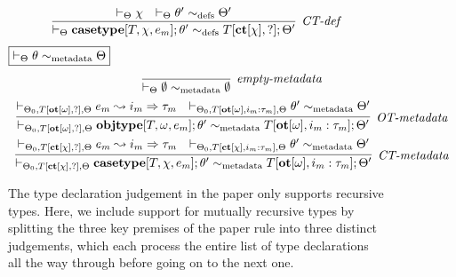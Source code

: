 \begin{figure}[h]
\[\begin{array}{c}
\infer[\textit{CT-def}]
  {\vdash_{\Theta} \keyw{casetype}[T,\chi,e_m];\theta' \sim_{\text{defs}} T[\keyw{ct}[\chi], ?]; \Theta'}
  { \vdash_\Theta \chi
  & \vdash _\Theta \theta' \sim_{\text{defs}} \Theta'}
\end{array}
\]
$\fbox{$\vdash_\Theta \theta \sim_{\text{metadata}} \Theta$}$
\[
\begin{array}{c}
\infer[\textit{empty-metadata}]
  {\vdash_{\Theta} \emptyset \sim_{\text{metadata}} \emptyset}
  { }\\[1ex]
\infer[\textit{OT-metadata}]
  {\vdash_{\Theta_0, T[\keyw{ot}[\omega],?], \Theta} \keyw{objtype}[T, \omega, e_m]; \theta' \sim_{\text{metadata}} T[\keyw{ot}[\omega],i_m:\tau_m]; \Theta'}
  { \vdash_{\Theta_0, T[\keyw{ot}[\omega], ?], \Theta} e_m \leadsto i_m \Rightarrow \tau_m
  & \vdash_{\Theta_0, T[\keyw{ot}[\omega], i_m : \tau_m], \Theta} \theta' \sim_{\text{metadata}} \Theta'}\\[1ex]

\infer[\textit{CT-metadata}]
  {\vdash_{\Theta_0, T[\keyw{ct}[\chi],?], \Theta} \keyw{casetype}[T, \chi, e_m]; \theta' \sim_{\text{metadata}} T[\keyw{ot}[\omega],i_m:\tau_m]; \Theta'}
  { \vdash_{\Theta_0, T[\keyw{ct}[\chi], ?], \Theta} e_m \leadsto i_m \Rightarrow \tau_m
  & \vdash_{\Theta_0, T[\keyw{ct}[\chi], i_m : \tau_m], \Theta} \theta' \sim_{\text{metadata}} \Theta'}
\end{array}
\]
\caption{The type declaration judgement in the paper only supports recursive types. Here, we include support for mutually recursive types by splitting the three key premises of the paper rule into three distinct judgements, which each process the entire list of type declarations all the way through before going on to the next one.}
\end{figure}

